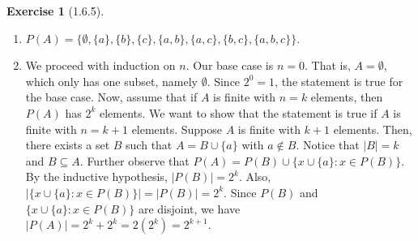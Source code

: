 \documentclass{amsart}
\theoremstyle{definition}
\newtheorem{exercise}{Exercise}
\newcommand{\abs}[1]{|#1|}
\newcommand{\card}[1]{\abs{#1}}
\newcommand{\st}{\mathrel{:}}
\begin{document}
\begin{exercise}[1.6.5]
  \begin{enumerate}[label={(\alph*)}]
    \item $P(A) = \{\emptyset, \{a\}, \{b\}, \{c\}, \{a, b\}, \{a, c\}, \{b,
      c\}, \{a, b, c\}\}$.
    \item We proceed with induction on $n$. Our base case is $n = 0$. That is,
      $A = \emptyset$, which only has one subset, namely $\emptyset$. Since $2^0
      = 1$, the statement is true for the base case. Now, assume that if $A$ is
      finite with $n = k$ elements, then $P(A)$ has $2^k$ elements. We want to
      show that the statement is true if $A$ is finite with $n = k + 1$
      elements. Suppose $A$ is finite with $k + 1$ elements. Then, there exists
      a set $B$ such that $A = B \cup \{a\}$ with $a \notin B$. Notice that
      $\card{B} = k$ and $B \subseteq A$. Further observe that $P(A) = P(B) \cup
      \{x \cup \{a\} \st x \in P(B)\}$. By the inductive hypothesis,
      $\card{P(B)} = 2^k$. Also, $\card{\{x \cup \{a\} \st x \in P(B)\}} =
      \card{P(B)} = 2^k$.  Since $P(B)$ and $\{x \cup \{a\} \st x \in P(B)\}$
      are disjoint, we have $\card{P(A)} = 2^k + 2^k = 2(2^k) = 2^{k+1}$.
  \end{enumerate}
\end{exercise}
\end{document}
